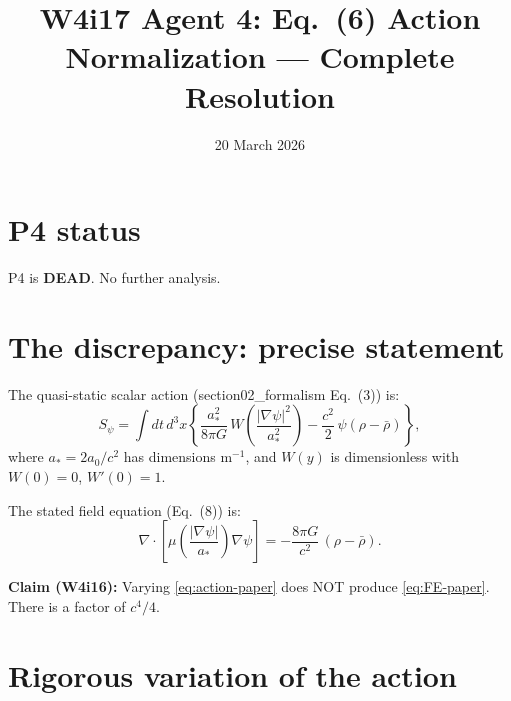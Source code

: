 \documentclass[aps,prd,twocolumn,nofootinbib]{revtex4-2}
\begin{document}
\title{W4i17 Agent 4: Eq.~(6) Action Normalization --- Complete Resolution}
\date{20 March 2026}
\maketitle

\section{P4 status}

P4 is \textbf{DEAD}. No further analysis.

\section{The discrepancy: precise statement}
\label{sec:statement}

The quasi-static scalar action (section02\_formalism Eq.~(3)) is:
\begin{equation}
S_\psi = \int dt\,d^3x\left\{
  \frac{a_*^2}{8\pi G}\,W\!\left(\frac{|\nabla\psi|^2}{a_*^2}\right)
  - \frac{c^2}{2}\,\psi(\rho - \bar\rho)
\right\},
\label{eq:action-paper}
\end{equation}
where $a_* = 2a_0/c^2$ has dimensions m$^{-1}$, and $W(y)$ is
dimensionless with $W(0) = 0$, $W'(0) = 1$.

The stated field equation (Eq.~(8)) is:
\begin{equation}
\nabla\cdot\!\left[\mu\!\left(\frac{|\nabla\psi|}{a_*}\right)\nabla\psi\right]
= -\frac{8\pi G}{c^2}\,(\rho - \bar\rho).
\label{eq:FE-paper}
\end{equation}

\textbf{Claim (W4i16):} Varying \eqref{eq:action-paper} does NOT
produce \eqref{eq:FE-paper}. There is a factor of $c^4/4$.

\section{Rigorous variation of the action}
\label{sec:variation}
\end{document}
